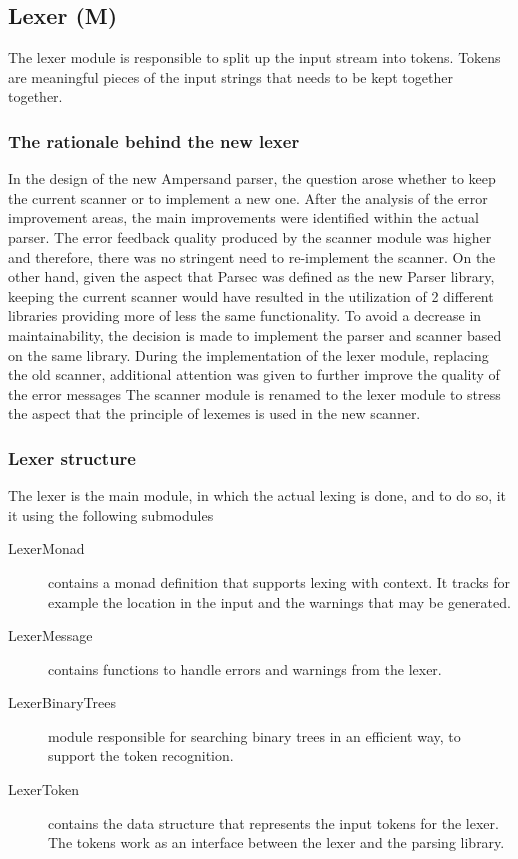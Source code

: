 \subsection{Lexer (M)}
\label{subsec:lexer}
The lexer module is responsible to split up the input stream into tokens.
Tokens are meaningful pieces of the input strings that needs to be kept together together.

\subsubsection{The rationale behind the new lexer}
In the design of the new Ampersand parser, the question arose whether to keep the current scanner or to implement a new one.
After the analysis of the error improvement areas, the main improvements were identified within the actual parser.
The error feedback quality produced by the scanner module was higher and therefore, there was no stringent need to re-implement the scanner.
On the other hand, given the aspect that Parsec was defined as the new Parser library, keeping the current scanner would have resulted in the utilization of 2 different libraries providing more of less the same functionality.
To avoid a decrease in maintainability, the decision is made to implement the parser and scanner based on the same library.
During the implementation of the lexer module, replacing the old scanner, additional attention was given to further improve the quality of the error messages
The scanner module is renamed to the lexer module to stress the aspect that the principle of lexemes is used in the new scanner.

\subsubsection{Lexer structure}


The lexer is the main module, in which the actual lexing is done, and to do so, it it using the following submodules

 \begin{description}
 
    \item[LexerMonad] contains a monad definition that supports lexing with context.
      It tracks for example the location in the input and the warnings that may be generated.
    
    \item[LexerMessage] contains functions to handle errors and warnings from the lexer.
    
    \item[LexerBinaryTrees] module responsible for searching binary trees in an efficient way, to support the token recognition.
    
    \item[LexerToken] contains the data structure that represents the input tokens for the lexer.
      The tokens work as an interface between the lexer and the parsing library.
  \end{description}

